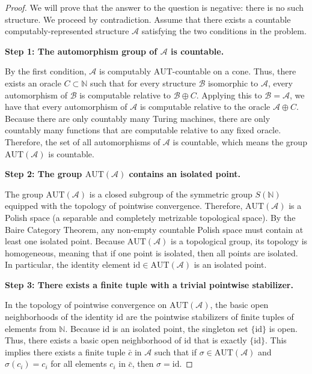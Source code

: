 \documentclass[12pt]{article}
\newcommand{\AUT}{\mathrm{AUT}}
\begin{document}
\begin{proof}
We will prove that the answer to the question is negative: there is no such structure. We proceed by contradiction. Assume that there exists a countable computably-represented structure $\mathcal{A}$ satisfying the two conditions in the problem.

\textbf{Step 1: The automorphism group of $\mathcal{A}$ is countable.}

By the first condition, $\mathcal{A}$ is computably $\AUT$-countable on a cone. Thus, there exists an oracle $C \subset \mathbb{N}$ such that for every structure $\mathcal{B}$ isomorphic to $\mathcal{A}$, every automorphism of $\mathcal{B}$ is computable relative to $\mathcal{B} \oplus C$. 
Applying this to $\mathcal{B} = \mathcal{A}$, we have that every automorphism of $\mathcal{A}$ is computable relative to the oracle $\mathcal{A} \oplus C$. Because there are only countably many Turing machines, there are only countably many functions that are computable relative to any fixed oracle. Therefore, the set of all automorphisms of $\mathcal{A}$ is countable, which means the group $\AUT(\mathcal{A})$ is countable.

\textbf{Step 2: The group $\AUT(\mathcal{A})$ contains an isolated point.}

The group $\AUT(\mathcal{A})$ is a closed subgroup of the symmetric group $S(\mathbb{N})$ equipped with the topology of pointwise convergence. Therefore, $\AUT(\mathcal{A})$ is a Polish space (a separable and completely metrizable topological space). 
By the Baire Category Theorem, any non-empty countable Polish space must contain at least one isolated point. Because $\AUT(\mathcal{A})$ is a topological group, its topology is homogeneous, meaning that if one point is isolated, then all points are isolated. In particular, the identity element $\mathrm{id} \in \AUT(\mathcal{A})$ is an isolated point.

\textbf{Step 3: There exists a finite tuple with a trivial pointwise stabilizer.}

In the topology of pointwise convergence on $\AUT(\mathcal{A})$, the basic open neighborhoods of the identity $\mathrm{id}$ are the pointwise stabilizers of finite tuples of elements from $\mathbb{N}$. 
Because $\mathrm{id}$ is an isolated point, the singleton set $\{\mathrm{id}\}$ is open. Thus, there exists a basic open neighborhood of $\mathrm{id}$ that is exactly $\{\mathrm{id}\}$. This implies there exists a finite tuple $\bar{c}$ in $\mathcal{A}$ such that if $\sigma \in \AUT(\mathcal{A})$ and $\sigma(c_i) = c_i$ for all elements $c_i$ in $\bar{c}$, then $\sigma = \mathrm{id}$.


\end{proof}
\end{document}
